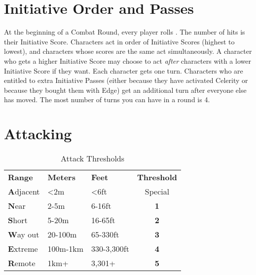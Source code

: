 \section{Initiative Order and Passes}

At the beginning of a Combat Round, every player rolls . The number of hits is their Initiative Score. Characters act in order of Initiative Scores (highest to lowest), and characters whose scores are the same act simultaneously. A character who gets a higher Initiative Score may choose to act \textit{after} characters with a lower Initiative Score if they want. Each character gets one turn. Characters who are entitled to extra Initiative Passes (either because they have activated Celerity or because they bought them with Edge) get an additional turn after everyone else has moved. The most number of turns you can have in a round is 4.

\section{Attacking}

\begin{wraptable}[8]{R}{8cm} \vspace{-1.2cm}
\centering {} \caption{Attack Thresholds}
\begin{tabular}{l l l c}
\textbf{Range} & \textbf{Meters} & \textbf{Feet} & \textbf{Threshold}\\
\textbf{A}djacent & <2m & <6ft & Special\\
\textbf{N}ear & 2-5m & 6-16ft & \textbf{1}\\
\textbf{S}hort & 5-20m & 16-65ft & \textbf{2}\\
\textbf{W}ay out & 20-100m & 65-330ft & \textbf{3}\\
\textbf{E}xtreme & 100m-1km & 330-3,300ft & \textbf{4}\\
\textbf{R}emote & 1km+ & 3,301+ & \textbf{5}\\
\end{tabular}
\end{wraptable}

